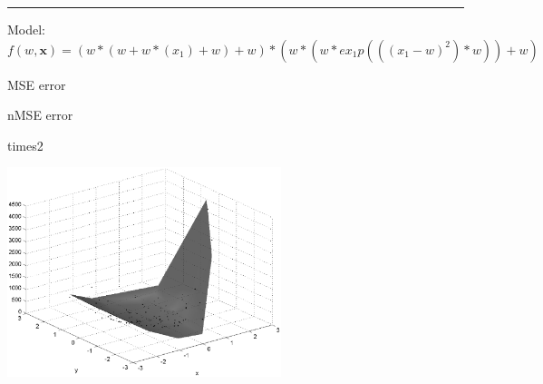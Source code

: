 \documentclass[12pt]{article}
\begin{document}
\hrule
\vspace{1cm}
Model: $f(w,\mathbf{x})=(w*(w+w*(x_1)+w)+w)*(w*(w*ex_1p(((x_1-w)^2)*w))+w)$

MSE error

nMSE error

\begin{multicols}{2}
\begin{bundle}{times2}\end{bundle}

\columnbreak
\includegraphics[width=8cm]{10.eps}
\end{multicols}
\end{document}
